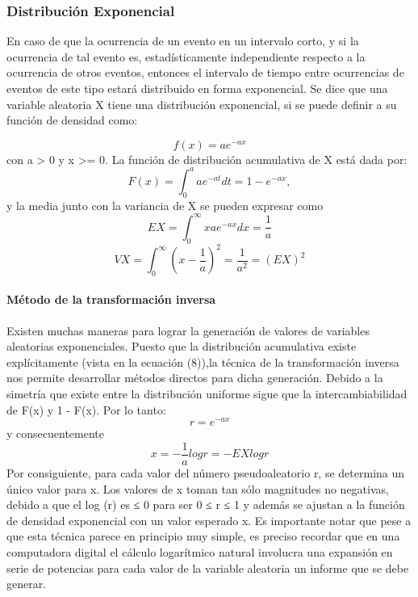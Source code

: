 \documentclass{article}
\begin{document}
  \subsubsection{Distribución Exponencial}

  En caso de que la ocurrencia de un evento en un intervalo corto, y si la ocurrencia de tal evento es, estadísticamente independiente respecto a la ocurrencia de otros eventos, entonces el intervalo de tiempo entre ocurrencias de eventos de este tipo estará distribuido en forma exponencial.
  Se dice que una variable aleatoria X tiene una distribución exponencial, si se puede definir a su función de densidad como:

  \begin{equation}
    f(x) = ae^{-ax}\label{eq:equation}
  \end{equation}
  con a > 0 y x >= 0.
  La función de distribución acumulativa de X está dada por:
  \begin{equation}
    F(x) = \int_{0}^{a} ae^{-at}dt = 1-e^{-ax},
  \end{equation}
  y la media junto con la variancia de X se pueden expresar como
  \begin{equation}
    EX = \int_{0}^{\infty} xae^{-ax}dx = \frac{1}{a}
  \end{equation}
  \begin{equation}
    VX = \int_{0}^{\infty} (x-\frac{1}{a})^2 = \frac{1}{a^2} = (EX)^2
  \end{equation}

  \paragraph{Método de la transformación inversa\newline}

  Existen muchas maneras para lograr la generación de valores de variables aleatorias exponenciales. Puesto que la
  distribución acumulativa existe explícitamente (vista en la ecuación (8)),la técnica de la transformación inversa nos permite desarrollar métodos directos para dicha generación.
  Debido a la simetría que existe entre la distribución uniforme sigue que la intercambiabilidad de F(x) y 1 - F(x). Por lo tanto:
  \begin{equation}
    r = e^{-ax}
  \end{equation}
  y consecuentemente
  \begin{equation}
    x = -\frac{1}{a}log r  = - EXlog r
  \end{equation}
  Por consiguiente, para cada valor del número pseudoaleatorio r, se determina un único valor para x. Los valores de
  x toman tan sólo magnitudes no negativas, debido a que el log (r) es ≤ 0 para ser 0 ≤ r ≤ 1 y además se ajustan a la
  función de densidad exponencial con un valor esperado x. Es importante notar que pese a que esta técnica parece en
  principio muy simple, es preciso recordar que en una computadora digital el cálculo logarítmico natural involucra una
  expansión en serie de potencias para cada valor de la variable aleatoria un informe que se debe generar.
\end{document}
